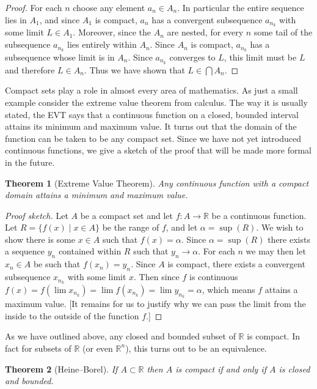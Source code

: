 \documentclass[11pt,oneside]{amsbook}
\newcommand{\R}{\mathbb R}
\theoremstyle{definition}
\theoremstyle{plain}
\newtheorem{theorem}{Theorem}[section]
\theoremstyle{definition}
\theoremstyle{remark}
\numberwithin{equation}{section}
\numberwithin{figure}{section}
\begin{document}
\begin{proof}
  For each $n$ choose any element $a_n\in A_n$. In particular the entire sequence lies in $A_1$, and since $A_1$ is compact, $a_n$ has a convergent subsequence $a_{n_k}$ with some limit $L\in A_1$. Moreover, since the $A_n$ are nested, for every $n$ some tail of the subsequence $a_{n_k}$ lies entirely within $A_n$. Since $A_n$ is compact, $a_{n_k}$ has a subsequence whose limit is in $A_n$. Since $a_{n_k}$ converges to $L$, this limit must be $L$ and therefore $L\in A_n$. Thus we have shown that $L\in\bigcap A_n$.
\end{proof}

Compact sets play a role in almost every area of mathematics. As just a small example consider the extreme value theorem from calculus. The way it is usually stated, the EVT says that a continuous function on a closed, bounded interval attains its minimum and maximum value. It turns out that the domain of the function can be taken to be any compact set. Since we have not yet introduced continuous functions, we give a sketch of the proof that will be made more formal in the future.

\begin{theorem}[Extreme Value Theorem]
  Any continuous function with a compact domain attains a minimum and maximum value.
\end{theorem}

\begin{proof}[Proof sketch]
  Let $A$ be a compact set and let $f\colon A\to\R$ be a continuous function. Let $R=\{f(x)\mid x\in A\}$ be the range of $f$, and let $\alpha=\sup(R)$. We wish to show there is some $x\in A$ such that $f(x)=\alpha$. Since $\alpha=\sup(R)$ there exists a sequence $y_n$ contained within $R$ such that $y_n\to\alpha$. For each $n$ we may then let $x_n\in A$ be such that $f(x_n)=y_n$. Since $A$ is compact, there exists a convergent subsequence $x_{n_k}$ with some limit $x$. Then since $f$ is continuous $f(x)=f(\lim x_{n_k})=\lim f(x_{n_k})=\lim y_{n_k}=\alpha$, which means $f$ attains a maximum value. [It remains for us to justify why we can pass the limit from the inside to the outside of the function $f$.]
\end{proof}

As we have outlined above, any closed and bounded subset of $\R$ is compact. In fact for subsets of $\R$ (or even $\R^n$), this turns out to be an equivalence.

\begin{theorem}[Heine--Borel]
  If $A\subset\R$ then $A$ is compact if and only if $A$ is closed and bounded.
\end{theorem}
\end{document}
